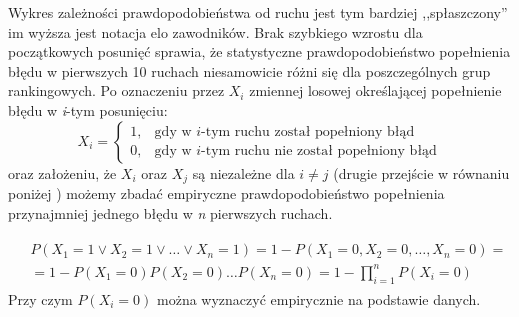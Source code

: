 \documentclass[inzynierska]{pwr_wmat_praca_dyplomowa}
\theoremstyle{plain}
\numberwithin{theorem}{chapter}
\theoremstyle{definition}
\numberwithin{theorem}{chapter}
\begin{document}
Wykres zależności prawdopodobieństwa od ruchu jest tym bardziej ,,spłaszczony'' im wyższa jest notacja elo zawodników. Brak szybkiego wzrostu dla początkowych posunięć sprawia, że statystyczne prawdopodobieństwo popełnienia błędu w pierwszych 10 ruchach niesamowicie różni się dla poszczególnych grup rankingowych.  Po oznaczeniu przez $X_i$ zmiennej losowej określającej popełnienie błędu w \textit{i}-tym posunięciu:
\begin{equation*}
X_i =
\begin{cases}
	1, & \text{gdy w $i$-tym ruchu został popełniony błąd}\\
	0, & \text{gdy w $i$-tym ruchu nie został popełniony błąd}
\end{cases}       
\end{equation*}
oraz założeniu, że $X_i$ oraz $X_j$ są niezależne dla $i \neq j$ (drugie przejście w równaniu poniżej \cite[str. 43]{prawdopodobienstwo_wstep}) możemy zbadać empiryczne prawdopodobieństwo popełnienia przynajmniej jednego błędu w \textit{n} pierwszych ruchach.

\begin{multline}
	\begin{split}
	& P(X_1 = 1 \vee X_2 = 1 \vee \dots \vee X_n = 1)  = 1 - P(X_1 = 0, X_2 = 0,\dots, X_n = 0) = \\
	& = 1 - P(X_1 = 0)P(X_2 = 0)\dots P(X_n = 0) = 1- \prod_{i=1}^{n}P(X_i=0)
	\end{split}
\end{multline}
Przy czym $P(X_i=0)$ można wyznaczyć empirycznie na podstawie danych.\\
\end{document}
